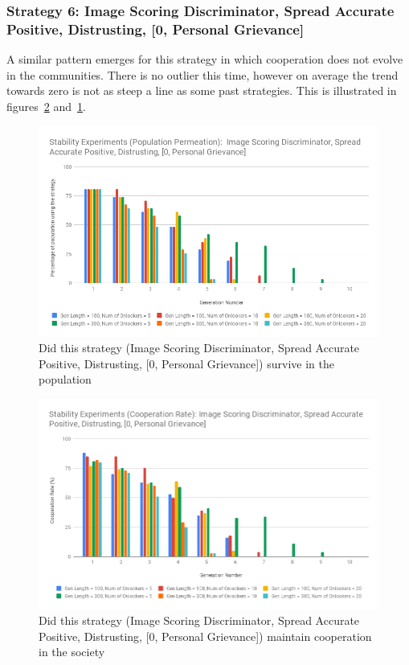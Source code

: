 \documentclass[]{final_report}
\begin{document}
\subsubsection{Strategy 6: Image Scoring Discriminator, Spread Accurate Positive, Distrusting, [0, Personal Grievance]} 
A similar pattern emerges for this strategy in which cooperation does not evolve in the communities. There is no outlier this time, however on average the trend towards zero is not as steep a line as some past strategies. This is illustrated in figures~\ref{fig:isdsapdt0pgCoop} and~\ref{fig:isdsapdt0pgPop}.
\begin{figure}
\begin{framed}
	\includegraphics[width=\textwidth]{isdsapdt0pgPop.png}
	\caption{Did this strategy (Image Scoring Discriminator, Spread Accurate Positive, Distrusting, [0, Personal Grievance]) survive in the population}
	\label{fig:isdsapdt0pgPop}
\end{framed}
\end{figure}
\begin{figure}
\begin{framed}
	\includegraphics[width=\textwidth]{isdsapdt0pgCoop.png}
	\caption{Did this strategy (Image Scoring Discriminator, Spread Accurate Positive, Distrusting, [0, Personal Grievance]) maintain cooperation in the society}
	\label{fig:isdsapdt0pgCoop}
\end{framed}
\end{figure}
\end{document}

